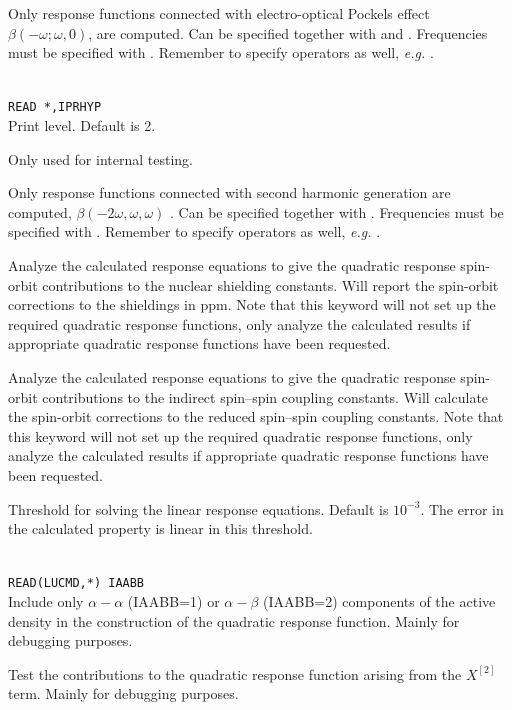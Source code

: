 \begin{description}
\item{}
Only response functions connected with electro-optical
Pockels effect
$\beta(-\omega; \omega,0)$, are computed.
Can be specified together with  and .
Frequencies must be specified with .
Remember to specify operators as well, {\it e.g.\/} .

\item{}\\
\verb|READ *,IPRHYP|\\
Print level. Default is 2.

\item{} Only used for internal testing.

\item{}
Only response functions connected with second harmonic
generation
are computed, $\beta(-2\omega,\omega,\omega)$ .
Can be specified together with .
Frequencies must be specified with .
Remember to specify operators as well, {\it e.g.\/} .

\item{}
Analyze the calculated response equations to give the quadratic
response spin-orbit contributions to the nuclear shielding
constants. Will report the spin-orbit corrections to the shieldings in
ppm. Note that this keyword will not set up the required quadratic
response functions, only analyze the calculated results if appropriate
quadratic response functions have been requested.

\item{}
Analyze the calculated response equations to give the quadratic
response spin-orbit contributions to the indirect spin--spin coupling
constants. Will calculate the spin-orbit corrections to the reduced spin--spin
coupling constants. Note that this keyword will not set up the
required quadratic
response functions, only analyze the calculated results if appropriate
quadratic response functions have been requested.

\item{}
Threshold for solving the linear response equations.
Default is $10^{-3}$. The error in the calculated property is linear
in this threshold.

\item{}\\
\verb|READ(LUCMD,*) IAABB|\\
Include only $\alpha-\alpha$ (IAABB=1) or $\alpha-\beta$ (IAABB=2)
components of the active density in the construction of the quadratic
response function. Mainly for debugging purposes.

\item{}
Test the contributions to the quadratic response function arising from
the $X^{\left[2\right]}$ term. Mainly for debugging purposes.

\end{description}

